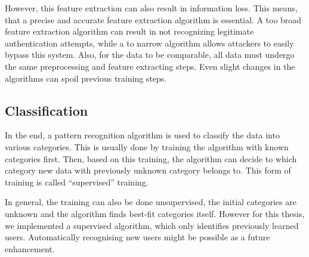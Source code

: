 However, this feature extraction can also result in information loss. This means, that a precise and accurate feature extraction algorithm is essential. A too broad feature extraction algorithm can result in not recognizing legitimate authentication attempts, while a to narrow algorithm allows attackers to easily bypass this system. Also, for the data to be comparable, all data must undergo the same preprocessing and feature extracting steps. Even slight changes in the algorithms can spoil previous training steps.

\subsection{Classification}
In the end, a pattern recognition algorithm is used to classify the data into various categories. This is usually done by training the algorithm with known categories first. Then, based on this training, the algorithm can decide to which category new data with previously unknown category belongs to. This form of training is called ``supervised'' training.

In general, the training can also be done unsupervised, \ie the initial categories are unknown and the algorithm finds best-fit categories itself. However for this thesis, we implemented a supervised algorithm, which only identifies previously learned users. Automatically recognising new users might be possible as a future enhancement.